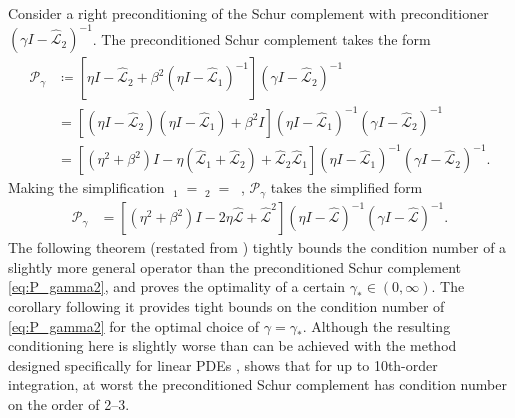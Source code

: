 \documentclass[review]{siamart}
\DeclareMathOperator{\cL}{\widehat{\mathcal{L}}}
\begin{document}
Consider a right preconditioning of the Schur complement with preconditioner
$(\gamma I- \widehat{\mathcal{L}}_2)^{-1}$. The preconditioned Schur complement
takes the form
%
\begin{align}\label{eq:P_gamma}
\mathcal{P}_\gamma &\coloneqq
	\left[\eta I - \widehat{\mathcal{L}}_2 + \beta^2 (\eta I - \widehat{\mathcal{L}}_1)^{-1}\right]
	(\gamma I- \widehat{\mathcal{L}}_2)^{-1} \\
& = \left[(\eta I - \widehat{\mathcal{L}}_2)(\eta I - \widehat{\mathcal{L}}_1) + \beta^2 I\right]
	(\eta I- \widehat{\mathcal{L}}_1)^{-1}(\gamma I- \widehat{\mathcal{L}}_2)^{-1} \nonumber\\
& = \left[ (\eta^2+\beta^2) I - \eta (\widehat{\mathcal{L}}_1 + \widehat{\mathcal{L}}_2) +
		\widehat{\mathcal{L}}_2\widehat{\mathcal{L}}_1 \right]
		(\eta I- \widehat{\mathcal{L}}_1)^{-1}(\gamma I- \widehat{\mathcal{L}}_2)^{-1}.
		\nonumber
\end{align}
%
Making the simplification $\cL_1 = \cL_2 = \cL$, $\mathcal{P}_\gamma$ takes the
simplified form
%
\begin{align}\label{eq:P_gamma2}
\mathcal{P}_\gamma & = \left[ (\eta^2+\beta^2) I - 2\eta \widehat{\mathcal{L}} +
	\widehat{\mathcal{L}}^2 \right](\eta I- \widehat{\mathcal{L}})^{-1}
	(\gamma I- \widehat{\mathcal{L}})^{-1}.
\end{align}
%
The following theorem (restated from \cite[Th. 5]{irk1}) tightly bounds
the condition number of a slightly more general operator than the preconditioned
Schur complement \eqref{eq:P_gamma2}, and proves the optimality of a certain
$\gamma_* \in (0,
\infty)$. The corollary following it provides tight bounds on the condition
number of \eqref{eq:P_gamma2} for the optimal choice of $\gamma = \gamma_*$.
%
Although the resulting conditioning here is slightly worse than can be achieved with the
method designed specifically for linear PDEs \cite[Cor. 6]{irk1},  shows that
for up to 10th-order integration, at worst the preconditioned Schur complement
has condition number on the order of 2--3.
\end{document}
